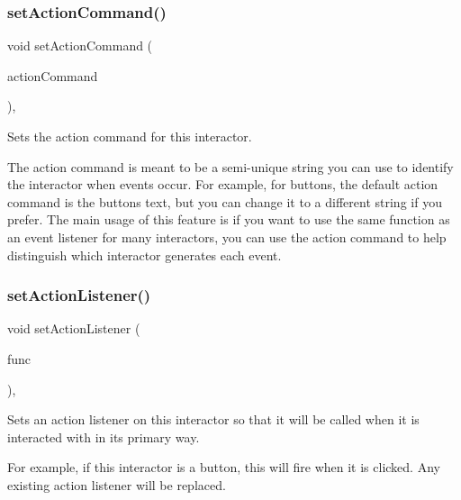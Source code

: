 \subsubsection{\texorpdfstring{set\+Action\+Command()}{setActionCommand()}}
{\footnotesize\ttfamily void set\+Action\+Command (\begin{DoxyParamCaption}\item[{const std\+::string \&}]{action\+Command }\end{DoxyParamCaption})\hspace{0.3cm}{\ttfamily [virtual]}, {\ttfamily [inherited]}}



Sets the action command for this interactor. 

The action command is meant to be a semi-\/unique string you can use to identify the interactor when events occur. For example, for buttons, the default action command is the button\textquotesingle{}s text, but you can change it to a different string if you prefer. The main usage of this feature is if you want to use the same function as an event listener for many interactors, you can use the action command to help distinguish which interactor generates each event. \mbox{\label{classGInteractor_adcfb4742430c88714fcf57e57ab8ea9c}} 
\subsubsection{\texorpdfstring{set\+Action\+Listener()}{setActionListener()}\hspace{0.1cm}{\footnotesize\ttfamily [1/2]}}
{\footnotesize\ttfamily void set\+Action\+Listener (\begin{DoxyParamCaption}\item[{G\+Event\+Listener}]{func }\end{DoxyParamCaption})\hspace{0.3cm}{\ttfamily [virtual]}, {\ttfamily [inherited]}}



Sets an action listener on this interactor so that it will be called when it is interacted with in its primary way. 

For example, if this interactor is a button, this will fire when it is clicked. Any existing action listener will be replaced. \mbox{\label{classGInteractor_aebd20a89c7a8a43a6fce999cf4f9fcf2}} 
